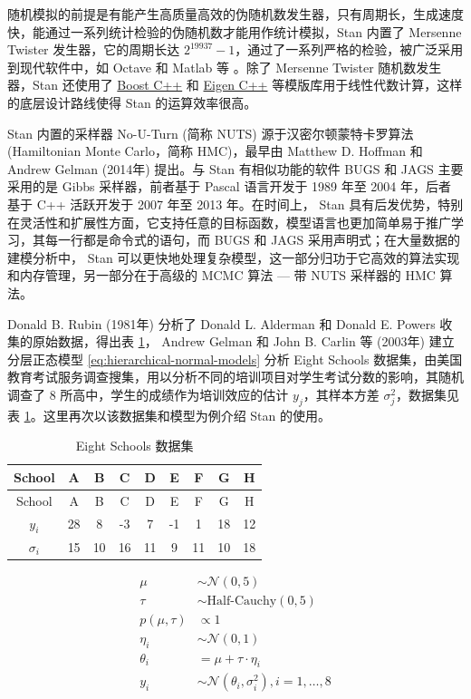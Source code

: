 \documentclass[12pt,a4paper,UTF8,twoside]{book}
\theoremstyle{definition}
\theoremstyle{definition}
\theoremstyle{definition}
\theoremstyle{remark}
\begin{document}
随机模拟的前提是有能产生高质量高效的伪随机数发生器，只有周期长，生成速度快，能通过一系列统计检验的伪随机数才能用作统计模拟，Stan
内置了 Mersenne Twister 发生器，它的周期长达
\(2^{19937}-1\)，通过了一系列严格的检验，被广泛采用到现代软件中，如
Octave 和 Matlab 等 \citep{Huang2017COS}。除了 Mersenne Twister
随机数发生器，Stan 还使用了 \href{https://www.boost.org/}{Boost C++} 和
\href{http://eigen.tuxfamily.org/index.php?title=Main_Page}{Eigen C++}
等模版库用于线性代数计算，这样的底层设计路线使得 Stan 的运算效率很高。

Stan 内置的采样器 No-U-Turn (简称 NUTS) 源于汉密尔顿蒙特卡罗算法
(Hamiltonian Monte Carlo，简称 HMC)，最早由 Matthew D. Hoffman 和 Andrew
Gelman (2014年) \citep{hoffman2014} 提出。与 Stan 有相似功能的软件 BUGS
和 JAGS 主要采用的是 Gibbs 采样器，前者基于 Pascal 语言开发于 1989 年至
2004 年，后者基于 C++ 活跃开发于 2007 年至 2013 年。在时间上， Stan
具有后发优势，特别在灵活性和扩展性方面，它支持任意的目标函数，模型语言也更加简单易于推广学习，其每一行都是命令式的语句，而
BUGS 和 JAGS 采用声明式；在大量数据的建模分析中， Stan
可以更快地处理复杂模型，这一部分归功于它高效的算法实现和内存管理，另一部分在于高级的
MCMC 算法 --- 带 NUTS 采样器的 HMC 算法。

Donald B. Rubin (1981年) \citep{Rubin1981} 分析了 Donald L. Alderman 和
Donald E. Powers \citep{Alderman1980} 收集的原始数据，得出表
\ref{tab:eight-high-schools}， Andrew Gelman 和 John B. Carlin 等
(2003年) \citep{Gelman2003} 建立分层正态模型
\eqref{eq:hierarchical-normal-models} 分析 Eight Schools
数据集，由美国教育考试服务调查搜集，用以分析不同的培训项目对学生考试分数的影响，其随机调查了
8 所高中，学生的成绩作为培训效应的估计 \(y_j\)，其样本方差
\(\sigma^2_j\)，数据集见表
\ref{tab:eight-high-schools}。这里再次以该数据集和模型为例介绍 Stan
的使用。

\begin{longtable}[]{@{}ccccccccc@{}}
\caption{\label{tab:eight-high-schools} Eight Schools 数据集}\tabularnewline
\toprule
School & A & B & C & D & E & F & G & H\tabularnewline
\midrule
\endfirsthead
\toprule
School & A & B & C & D & E & F & G & H\tabularnewline
\midrule
\endhead
\(y_i\) & 28 & 8 & -3 & 7 & -1 & 1 & 18 & 12\tabularnewline
\(\sigma_i\) & 15 & 10 & 16 & 11 & 9 & 11 & 10 & 18\tabularnewline
\bottomrule
\end{longtable}

\begin{equation}
\begin{aligned}
     \mu & \sim \mathcal{N}(0,5) \\
    \tau & \sim \text{Half-Cauchy}(0,5) \\
p(\mu,\tau) & \propto 1 \\
  \eta_i & \sim \mathcal{N}(0,1) \\
\theta_i &  =   \mu + \tau \cdot \eta_i \\
     y_i & \sim \mathcal{N}(\theta_i,\sigma^2_{i}), i = 1,\ldots,8
\end{aligned}
\label{eq:hierarchical-normal-models}
\end{equation}
\end{document}
